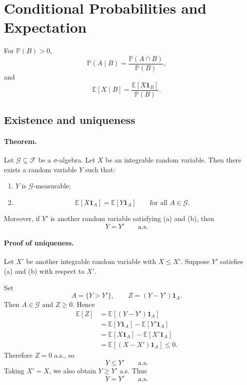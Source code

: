 \documentclass[11pt,a4paper]{article}
\begin{document}
\section{Conditional Probabilities and Expectation}

For $\mathbb{P}(B)>0$,
\[
\mathbb{P}(A\mid B)
=
\frac{\mathbb{P}(A\cap B)}{\mathbb{P}(B)},
\]
and
\[
\mathbb{E}[X\mid B]
=
\frac{\mathbb{E}[X\mathbf{1}_B]}{\mathbb{P}(B)}.
\]

\subsection{Existence and uniqueness}

\paragraph{Theorem.}
Let $\mathcal{G}\subseteq\mathcal{F}$ be a $\sigma$-algebra.
Let $X$ be an integrable random variable. Then there exists
a random variable $Y$ such that:
\begin{enumerate}
    \item[(a)] $Y$ is $\mathcal{G}$-measurable;

    \item[(b)]
    \[
    \mathbb{E}[X\mathbf{1}_A]
    =
    \mathbb{E}[Y\mathbf{1}_A]
    \qquad\text{for all }A\in\mathcal{G}.
    \]
\end{enumerate}
Moreover, if $Y'$ is another random variable satisfying
(a) and (b), then
\[
Y=Y'\qquad\text{a.s.}
\]

\paragraph{Proof of uniqueness.}
Let $X'$ be another integrable random variable with
$X\leq X'$. Suppose $Y'$ satisfies (a) and (b) with respect
to $X'$.

Set
\[
A=\{Y>Y'\},
\qquad
Z=(Y-Y')\mathbf{1}_A.
\]
Then $A\in\mathcal{G}$ and $Z\geq0$. Hence
\[
\begin{aligned}
\mathbb{E}[Z]
&=
\mathbb{E}[(Y-Y')\mathbf{1}_A]\\
&=
\mathbb{E}[Y\mathbf{1}_A]
-
\mathbb{E}[Y'\mathbf{1}_A]\\
&=
\mathbb{E}[X\mathbf{1}_A]
-
\mathbb{E}[X'\mathbf{1}_A]\\
&=
\mathbb{E}[(X-X')\mathbf{1}_A]
\leq0.
\end{aligned}
\]
Therefore $Z=0$ a.s., so
\[
Y\leq Y'\qquad\text{a.s.}
\]
Taking $X'=X$, we also obtain $Y\geq Y'$ a.s. Thus
\[
Y=Y'\qquad\text{a.s.}
\]
\end{document}
